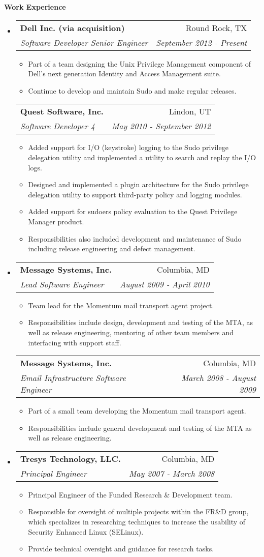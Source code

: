 \documentclass[letterpaper,11pt]{article}
\makeatletter
\newcommand{\resitem}[1]{\item #1 \vspace{-2pt}}
\newcommand{\resheading}[1]{{\large \colorbox{mygrey}{\begin{minipage}{\textwidth}{\textbf{#1 \vphantom{p\^{E}}}}\end{minipage}}}}
\newcommand{\ressubheading}[4]{
\begin{tabular*}{7.0in}{l@{\extracolsep{\fill}}r}
      \textbf{#1} & #2 \\
      \textit{#3} & \textit{#4} \\
\end{tabular*}\vspace{-6pt}}
\makeatother
\begin{document}
\resheading{Work Experience}
\begin{itemize}
\item
   \ressubheading{Dell Inc. (via acquisition)}{Round Rock, TX}{Software Developer Senior Engineer}{September 2012 - Present}
   \begin{itemize}
      \resitem{Part of a team designing the Unix Privilege Management component of Dell's next generation Identity and Access Management suite.}
      \resitem{Continue to develop and maintain Sudo and make regular releases.}
   \end{itemize}
   \ressubheading{Quest Software, Inc.}{Lindon, UT}{Software Developer 4}{May 2010 - September 2012}
   \begin{itemize}
      \resitem{Added support for I/O (keystroke) logging to the Sudo privilege delegation utility and implemented a utility to search and replay the I/O logs.}
      \resitem{Designed and implemented a plugin architecture for the Sudo privilege delegation utility to support third-party policy and logging modules.}
      \resitem{Added support for sudoers policy evaluation to the Quest Privilege Manager product.}
      \resitem{Responsibilities also included development and maintenance of Sudo including release engineering and defect management.}
   \end{itemize}
\item
   \ressubheading{Message Systems, Inc.}{Columbia, MD}{Lead Software Engineer}{August 2009 - April 2010}
   \begin{itemize}
      \resitem{Team lead for the Momentum mail transport agent project.}
      \resitem{Responsibilities include design, development and testing of the MTA, as well as release engineering, mentoring of other team members and interfacing with support staff.}
   \end{itemize}
   \ressubheading{Message Systems, Inc.}{Columbia, MD}{Email Infrastructure Software Engineer}{March 2008 - August 2009}
   \begin{itemize}
      \resitem{Part of a small team developing the Momentum mail transport agent.}
      \resitem{Responsibilities include general development and testing of the MTA as well as release engineering.}
   \end{itemize}

\item
   \ressubheading{Tresys Technology, LLC.}{Columbia, MD}{Principal Engineer}{May 2007 - March 2008}
   \begin{itemize}
      \resitem{Principal Engineer of the Funded Research \& Development team.}
      \resitem{Responsible for oversight of multiple projects within the FR\&D group, which specializes in researching techniques to increase the usability of Security Enhanced Linux (SELinux).}
      \resitem{Provide technical oversight and guidance for research tasks.}
   \end{itemize}


\end{itemize}
\end{document}
